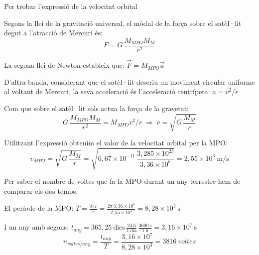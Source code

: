 \begin{solapartat}
Per trobar l'expressió de la velocitat orbital

 Segons la llei de la gravitació universal, el mòdul de la força sobre el satèl·lit degut a l'atracció de Mercuri és:
\[ F = G\,\frac{M_{MPO} M_M}{r^2} \]

 La segona llei de Newton estableix que: $\vec{F} = M_{MPO}\vec{a}$

 D'altra banda, considerant que el satèl·lit descriu un moviment circular uniforme al voltant de Mercuri, la seva acceleració és l'acceleració centrípeta: $a = v^2/r$

 Com que sobre el satèl·lit sols actua la força de la gravetat:
\[ G\,\frac{M_{MPO} M_M}{r^2} = M_{MPO} v^2/r \;\Rightarrow\; v = \sqrt{G\,\frac{M_M}{r}} \]

 Utilitzant l'expressió obtenim el valor de la velocitat orbital per la MPO:
\[ v_{MPO} = \sqrt{G\,\frac{M_M}{r}} = \sqrt{6,67\times 10^{-11}\,\frac{3,285\times 10^{23}}{3,36\times 10^{6}}} = 2,55\times 10^{3}\ \mathrm{m/s} \]

 Per saber el nombre de voltes que fa la MPO durant un any terrestre hem de comparar els dos temps.

El període de la MPO: $T = \frac{2\pi r}{v} = \frac{2\pi\, 3,36\times 10^{6}}{2,55\times 10^{3}} = 8,28\times 10^{3}\ \mathrm{s}$

 I un any amb segons: $t_{any} = 365,25\ \mathrm{dies}\,\frac{24\ \mathrm{h}}{1\ \mathrm{dia}}\,\frac{3600\ \mathrm{s}}{1\ \mathrm{h}} = 3,16\times 10^{7}\ \mathrm{s}$
\[ n_{voltes/any} = \frac{t_{any}}{T} = \frac{3,16\times 10^{7}}{8,28\times 10^{3}} = 3816\ \mathit{voltes} \]
\end{solapartat}

